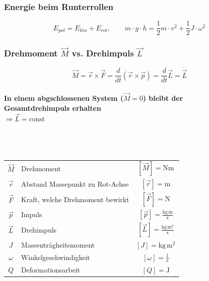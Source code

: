 		\subsubsection{Energie beim Runterrollen}

			$$ \boxed{E_{pot} = E_{kin} + E_{rot} , \quad \quad m \cdot g \cdot h = \frac{1}{2}m \cdot v^2 + \frac{1}{2}J \cdot \omega^2} $$

		\subsubsection{Drehmoment $\vec{M}$ vs. Drehimpuls $\vec{L}$}
			$$ \boxed{ \vec{M} = \vec{r} \times \vec{F} = \frac{d}{dt} (\vec{r} \times \vec{p}) =  \frac{d}{dt} \vec{L} = \dot{\vec{L}} }$$ \\
			
			\textbf{In einem abgschlossenen System ($\vec{M} = 0$) bleibt der \\
			Gesamtdrehimpuls erhalten} \\
			$\Rightarrow \vec{L} = \text{const}$ \\
			\\
			\\
			\\
			\begin{tabular}{c l c}
				$\vec{M}$ & Drehmoment & $[\vec{M}] = \mathrm{Nm}$ \\
				$\vec{r}$ & Abstand Massepunkt zu Rot-Achse & $[\vec{r}] = \mathrm{m}$ \\
				$\vec{F}$ & Kraft, welche Drehmoment bewirkt & $[\vec{F}] = \mathrm{N}$ \\
				$\vec{p}$ & Impuls & $[\vec{p}] = \mathrm{\frac{kg \, m}{s}}$ \\
				$\vec{L}$ & Drehimpuls & $[\vec{L}] = \mathrm{\frac{kg \, m^2}{s}}$ \\
				$J$  & Massenträgheitsmoment & $[J] = \mathrm{kg \, m^2}$ \\
				$\omega$ & Winkelgeschwindigkeit & $[\omega] = \mathrm{\frac{1}{s}}$ \\
				$Q$ & Deformationsarbeit & $[Q] = \mathrm{J}$ \\
			\end{tabular}

